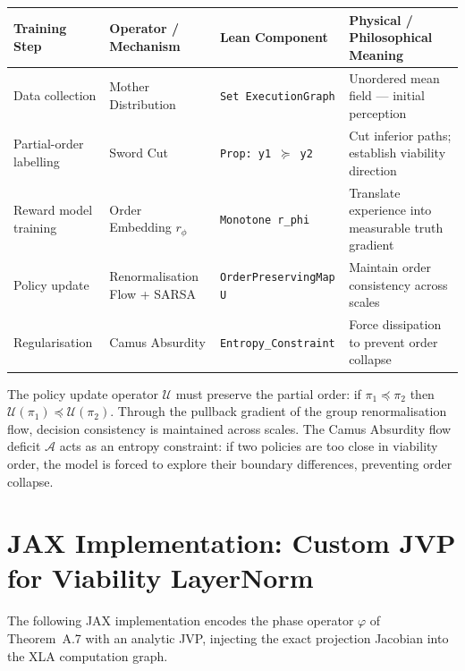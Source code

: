 \documentclass[11pt,a4paper]{article}
\theoremstyle{definition}
\theoremstyle{remark}
\begin{document}
\begin{table}[H]
\centering
\small
\begin{tabularx}{\textwidth}{l l l X}
\toprule
\textbf{Training Step} & \textbf{Operator / Mechanism} & \textbf{Lean Component} & \textbf{Physical / Philosophical Meaning} \\
\midrule
Data collection & Mother Distribution & \texttt{Set ExecutionGraph} & Unordered mean field --- initial perception \\
Partial-order labelling & Sword Cut & \texttt{Prop: y1 $\succeq$ y2} & Cut inferior paths; establish viability direction \\
Reward model training & Order Embedding $r_\phi$ & \texttt{Monotone r\_phi} & Translate experience into measurable truth gradient \\
Policy update & Renormalisation Flow + SARSA & \texttt{OrderPreservingMap U} & Maintain order consistency across scales \\
Regularisation & Camus Absurdity & \texttt{Entropy\_Constraint} & Force dissipation to prevent order collapse \\
\bottomrule
\end{tabularx}
\end{table}

The policy update operator $\mathcal{U}$ must preserve the partial order: if $\pi_1 \preceq \pi_2$ then $\mathcal{U}(\pi_1) \preceq \mathcal{U}(\pi_2)$. Through the pullback gradient of the group renormalisation flow, decision consistency is maintained across scales. The Camus Absurdity flow deficit $\mathcal{A}$ acts as an entropy constraint: if two policies are too close in viability order, the model is forced to explore their boundary differences, preventing order collapse.


\section{JAX Implementation: Custom JVP for Viability LayerNorm}

The following JAX implementation encodes the phase operator $\varphi$ of Theorem~A.7 with an analytic JVP, injecting the exact projection Jacobian into the XLA computation graph.
\end{document}

